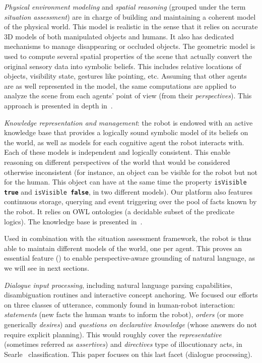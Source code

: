 \begin{inparaenum}[\itshape 1)]

\item \emph{Physical environment modeling} and \emph{spatial reasoning}
(grouped under the term \emph{situation
assessment})  are in charge of building and
maintaining a coherent model of the physical world. This model is realistic in
the sense that it relies on accurate 3D models of both manipulated objects and
humans. It also has dedicated mechanisms to manage disappearing or occluded
objects.  The geometric model is used to compute several spatial properties of
the scene that actually convert the original sensory data into symbolic
beliefs. This includes relative locations of objects, visibility state,
gestures like pointing, etc.  Assuming that other agents are as well
represented in the model, the same computations are applied to analyze the
scene from each agents' point of view (\ie from their \emph{perspectives}).
This approach is presented in depth in~\cite{Sisbot2011}.

\item \emph{Knowledge representation and management}: the robot is endowed with
an active knowledge base that provides a logically sound symbolic model of its
beliefs on the world, as well as models for each cognitive agent the robot
interacts with. Each of these models is independent and logically consistent.
This enable reasoning on different perspectives of the world that would be
considered otherwise inconsistent (for instance, an object can be visible for
the robot but not for the human. This object can have at the same time the
property {\tt isVisible \textbf{true}} and {\tt isVisible \textbf{false}}, in
two different models).  Our platform also features continuous storage, querying
and event triggering over the pool of facts known by the robot. It relies on
OWL ontologies (a decidable subset of the predicate logics). The knowledge base
is presented in~\cite{Lemaignan2010}.

Used in combination with the situation assessment framework, the robot is thus
able to maintain different models of the world, one per agent. This proves an
essential feature (\cite{Roy2005, Kruijff2010}) to enable perspective-aware
grounding of natural language, as we will see in next sections.

\item \emph{Dialogue input processing}, including natural language parsing
capabilities, disambiguation routines and interactive concept anchoring. We
focused our efforts on three classes of utterance, commonly found in
human-robot interaction: \emph{statements} (\ie new facts the human wants to
inform the robot), \emph{orders} (or more generically \emph{desires}) and
\emph{questions on declarative knowledge} (whose answers do not require
explicit planning). This would roughly cover the \emph{representative}
(sometimes referred as \emph{assertives}) and \emph{directives} type of
illocutionary acts, in Searle~\cite{Searle1976} classification. This paper
focuses on this last facet (dialogue processing).

\end{inparaenum}

